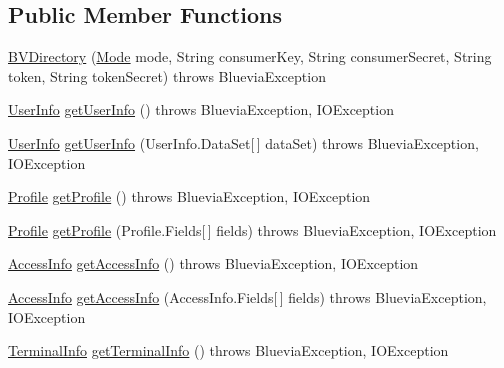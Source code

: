 \subsection*{Public Member Functions}
\begin{DoxyCompactItemize}
\item 
\hyperlink{classcom_1_1bluevia_1_1directory_1_1client_1_1BVDirectory_ad8192290d6e30e9b4a94b4180a4af3cb}{BVDirectory} (\hyperlink{classcom_1_1bluevia_1_1commons_1_1client_1_1BVBaseClient_a5f4a4a27d73a8ddd0ce450a6c7a4d1b7}{Mode} mode, String consumerKey, String consumerSecret, String token, String tokenSecret)  throws BlueviaException
\item 
\hyperlink{classcom_1_1bluevia_1_1directory_1_1data_1_1UserInfo}{UserInfo} \hyperlink{classcom_1_1bluevia_1_1directory_1_1client_1_1BVDirectory_ac2e887d2e7332095dea05f0ec21a6fc3}{getUserInfo} ()  throws BlueviaException, IOException 
\item 
\hyperlink{classcom_1_1bluevia_1_1directory_1_1data_1_1UserInfo}{UserInfo} \hyperlink{classcom_1_1bluevia_1_1directory_1_1client_1_1BVDirectory_a29c2fe45369f876e20e6cf9e6f3a32b5}{getUserInfo} (UserInfo.DataSet\mbox{[}$\,$\mbox{]} dataSet)  throws BlueviaException, IOException 
\item 
\hyperlink{classcom_1_1bluevia_1_1directory_1_1data_1_1Profile}{Profile} \hyperlink{classcom_1_1bluevia_1_1directory_1_1client_1_1BVDirectory_ae6c88fbacc379e0f2045ae926607743a}{getProfile} ()  throws BlueviaException, IOException 
\item 
\hyperlink{classcom_1_1bluevia_1_1directory_1_1data_1_1Profile}{Profile} \hyperlink{classcom_1_1bluevia_1_1directory_1_1client_1_1BVDirectory_ad987119d1c9e5e6416ebd8a91322dd40}{getProfile} (Profile.Fields\mbox{[}$\,$\mbox{]} fields)  throws BlueviaException, IOException 
\item 
\hyperlink{classcom_1_1bluevia_1_1directory_1_1data_1_1AccessInfo}{AccessInfo} \hyperlink{classcom_1_1bluevia_1_1directory_1_1client_1_1BVDirectory_a2234c9048a5e5223721beaed8627cfb8}{getAccessInfo} ()  throws BlueviaException, IOException 
\item 
\hyperlink{classcom_1_1bluevia_1_1directory_1_1data_1_1AccessInfo}{AccessInfo} \hyperlink{classcom_1_1bluevia_1_1directory_1_1client_1_1BVDirectory_a4e87d1058aeb7e69b3c997442d085b85}{getAccessInfo} (AccessInfo.Fields\mbox{[}$\,$\mbox{]} fields)  throws BlueviaException, IOException 
\item 
\hyperlink{classcom_1_1bluevia_1_1directory_1_1data_1_1TerminalInfo}{TerminalInfo} \hyperlink{classcom_1_1bluevia_1_1directory_1_1client_1_1BVDirectory_aebcc4e47de1152f103383ec172bede45}{getTerminalInfo} ()  throws BlueviaException, IOException 

\end{DoxyCompactItemize}
